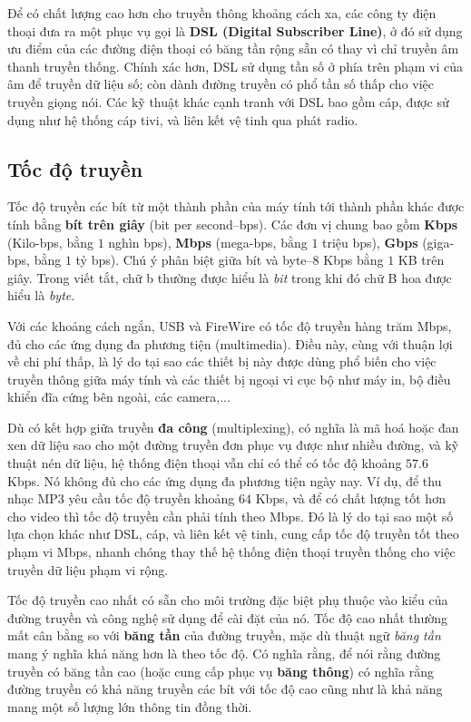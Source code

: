 Để có chất lượng cao hơn cho truyền thông khoảng cách xa, các công ty điện thoại đưa ra
một phục vụ gọi là \textbf{DSL (Digital Subscriber Line)}, ở đó sử dụng ưu điểm của các
đường điện thoại có băng tần rộng sẵn có thay vì chỉ truyền âm thanh truyền thống. Chính
xác hơn, DSL sử dụng tần số ở phía trên phạm vi của âm để truyền dữ liệu số; còn dành
đường truyền có phổ tần số thấp cho việc truyền giọng nói.  Các kỹ thuật khác cạnh tranh
với DSL bao gồm cáp, được sử dụng như hệ thống cáp tivi, và liên kết vệ tinh qua phát
radio.

\subsection*{Tốc độ truyền}
Tốc độ truyền các bít từ một thành phần của máy tính tới thành phần khác được tính bằng
\textbf{bít trên giây} (bit per second--bps). Các đơn vị chung bao gồm \textbf{Kbps}
(Kilo-bps, bằng $1$ nghìn bps), \textbf{Mbps} (mega-bps, bằng $1$ triệu bps),
\textbf{Gbps} (giga-bps, bằng $1$ tỷ bps). Chú ý phân biệt giữa bít và byte--$8$ Kbps
bằng $1$ KB trên giây. Trong viết tắt, chữ b thường được hiểu là \textit{bit} trong khi đó
chữ B hoa được hiểu là \textit{byte}.

Với các khoảng cách ngắn, USB và FireWire có tốc độ truyền hàng trăm Mbps, đủ cho các ứng
dụng đa phương tiện (multimedia). Điều này, cùng với thuận lợi về chi phí thấp, là lý do
tại sao các thiết bị này được dùng phổ biến cho việc truyền thông giữa máy tính và các
thiết bị ngoại vi cục bộ như máy in, bộ điều khiển đĩa cứng bên ngoài, các camera,...

Dù có kết hợp giữa truyền \textbf{đa công} (multiplexing), có nghĩa là mã hoá hoặc đan xen
dữ liệu sao cho một đường truyền đơn phục vụ được như nhiều đường, và kỹ thuật nén dữ
liệu, hệ thống điện thoại vẫn chỉ có thể có tốc độ khoảng $57.6$ Kbps. Nó không đủ cho các
ứng dụng đa phương tiện ngày nay. Ví dụ, để thu nhạc MP3 yêu cầu tốc độ truyền khoảng $64$
Kbps, và để có chất lượng tốt hơn cho video thì tốc độ truyền cần phải tính theo Mbps. Đó
là lý do tại sao một số lựa chọn khác như DSL, cáp, và liên kết vệ tinh, cung cấp tốc độ
truyền tốt theo phạm vi Mbps, nhanh chóng thay thế hệ thống điện thoại truyền thống cho
việc truyền dữ liệu phạm vi rộng.

Tốc độ truyền cao nhất có sẵn cho môi trường đặc biệt phụ thuộc vào kiểu của đường truyền
và công nghệ sử dụng để cài đặt của nó. Tốc độ cao nhất thường mất cân bằng so với
\textbf{băng tần} của đường truyền, mặc dù thuật ngữ \textit{băng tần} mang ý nghĩa khả
năng hơn là theo tốc độ. Có nghĩa rằng, để nói rằng đường truyền có băng tần cao (hoặc
cung cấp phục vụ \textbf{băng thông}) có nghĩa rằng đường truyền có khả năng truyền các
bít với tốc độ cao cũng như là khả năng mang một số lượng lớn thông tin đồng thời.

